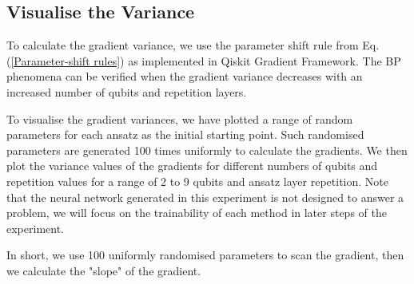 \subsection{Visualise the Variance}
To calculate the gradient variance, we use the parameter shift rule from Eq. (\ref{Parameter-shift rules}) as implemented in Qiskit Gradient Framework.
The BP phenomena can be verified when the gradient variance decreases with an increased number of qubits and repetition layers.

To visualise the gradient variances, we have plotted a range of random parameters for each ansatz as the initial starting point.
Such randomised parameters are generated 100 times uniformly to calculate the gradients.
We then plot the variance values of the gradients for different numbers of qubits and repetition values for a range of 2 to 9 qubits and ansatz layer repetition.
Note that the neural network generated in this experiment is not designed to answer a problem, we will focus on the trainability of each method in later steps of the experiment.

In short, we use 100 uniformly randomised parameters to scan the gradient, then we calculate the "slope" of the gradient.